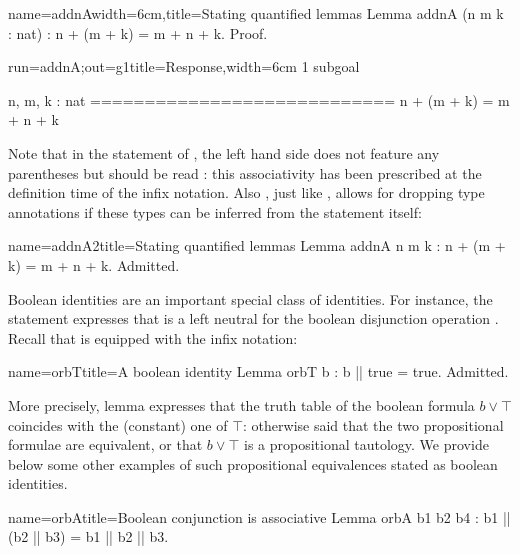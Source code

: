 \begin{coq}{name=addnA}{width=6cm,title=Stating quantified lemmas}
Lemma addnA (n m k : nat) :
  n + (m + k) = m + n + k.
Proof.
\end{coq}
\begin{coqout}{run=addnA;out=g1}{title=Response,width=6cm}
1 subgoal

 n, m, k : nat
 ============================
  n + (m + k) = m + n + k
\end{coqout}

Note that in the statement of , the left hand side does not
feature any parentheses but should be read : this
associativity has been prescribed at the definition time of the infix
\C{+} notation. Also
, just like , allows for
dropping type annotations if these types can be inferred from the
statement itself:

\begin{coq}{name=addnA2}{title=Stating quantified lemmas}
Lemma addnA n m k : n + (m + k) = m + n + k.
Admitted.
\end{coq}


Boolean identities are an important special class of identities. For
instance, the~ statement expresses that  is a left
neutral for the boolean disjunction operation . Recall that
 is equipped with the \C{||} infix notation:

\begin{coq}{name=orbT}{title=A boolean identity}
Lemma orbT b : b || true = true.
Admitted.
\end{coq}


More precisely, lemma 
expresses that the truth table of the boolean formula $b \vee \top$
coincides with the (constant) one of $\top$: otherwise said that the
two propositional formulae are equivalent, or that $b \vee \top$ is a
propositional tautology. We provide below some other examples of such
propositional equivalences stated as boolean identities.

\begin{coq}{name=orbA}{title=Boolean conjunction is associative}
Lemma orbA b1 b2 b4 :
  b1 || (b2 || b3) = b1 || b2 || b3.
\end{coq}

